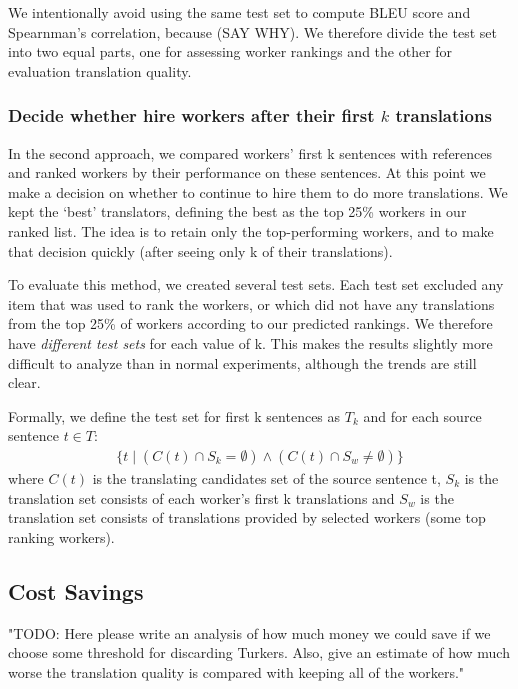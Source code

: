 \documentclass[11pt]{article}
\begin{document}
We intentionally avoid using the same test set to compute BLEU score and Spearnman's correlation, because (SAY WHY).  We therefore divide the test set into two equal parts, one for assessing worker rankings and the other for evaluation translation quality.

\subsubsection{Decide whether hire workers after their first $k$ translations}

In the second approach, we compared workers' first k sentences with references and ranked workers by their performance on these sentences.  At this point we make a decision on whether to continue to hire them to do more translations.  We kept the `best' translators, defining the best as the top 25\% workers in our ranked list.  The idea is to retain only the top-performing workers, and to make that decision quickly (after seeing only k of their translations).  

To evaluate this method, we created several test sets.  Each test set excluded any item that was used to rank the workers, or which did not have any translations from the top 25\% of workers according to our predicted rankings.  We therefore have \emph{different test sets} for each value of k.  This makes the results slightly more difficult to analyze than in normal experiments, although the trends are still clear.

Formally, we define the test set for first k sentences as $T_k$ and for each source sentence $t \in T$:
\begin{align*}
  \{ t \mid (C(t) \cap S_k = \emptyset)   \wedge (C(t) \cap S_w \neq \emptyset)    \}
\end{align*}
where $C(t)$ is the translating candidates set of the source sentence t, $S_k$ is the translation set consists of each worker's first k translations and $S_w$ is the translation set consists of translations provided by selected workers (some top ranking workers).

\subsection{Cost Savings}

"TODO: Here please write an analysis of how much money we could save if we choose some threshold for discarding Turkers.  Also, give an estimate of how much worse the translation quality is compared with keeping all of the workers."
\end{document}
